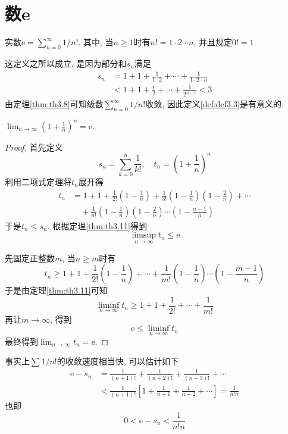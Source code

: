 \documentclass[cn,12pt,math=mtpro2,citestyle=gb7714-2015,bibstyle=gb7714-2015,twocol]{elegantbook}
\newcommand{\limn}{\lim_{n\to\infty}}
\begin{document}
\section{数e}
\begin{definition}\label{def:def3.3}
实数$ \text{e}=\sum_{n=0}^{\infty}1/{n!}$. 其中, 当$n\geq 1$时有$n!=1\cdot2\cdots n$, 并且规定$0!=1$.
\end{definition}
这定义之所以成立, 是因为部分和$s_n$满足
\begin{align*}
s_n&=1+1+\frac{1}{1\cdot2}+\cdots+\frac{1}{1\cdot2\cdots n} \\
&<1+1+\frac{1}{2}+\cdots+\frac{1}{2^{n-1}}<3
\end{align*}
由定理\ref{thm:th3.8}可知级数$\sum_{n=0}^{\infty}1/{n!}$收敛, 因此定义\ref{def:def3.3}是有意义的.
\begin{theorem}\label{thm:th3.18}
  $\displaystyle\limn \left(1+\frac{1}{n}\right)^n=\text{e}$.
\end{theorem}
\begin{proof}
  首先定义
  $$ s_n=\sum_{k=0}^{n}\frac{1}{k!},\quad t_n=\left(1+\frac{1}{n}\right)^n$$
  利用二项式定理将$t_n$展开得
  \begin{align*}
  t_n&=1+1+\frac{1}{2!}\left(1-\frac{1}{n}\right)+\frac{1}{3!}\left(1-\frac{1}{n}\right)\left(1-\frac{2}{n}\right)+\cdots \\
  &\quad +\frac{1}{n!}\left(1-\frac{1}{n}\right)\left(1-\frac{2}{n}\right)\cdots\left(1-\frac{n-1}{n}\right)
  \end{align*}
  于是$t_n\leq s_n$. 根据定理\ref{thm:th3.11}得到$$\displaystyle\limsup_{n\to\infty} t_n\leq \text{e}$$

  先固定正整数$m$, 当$n\geq m$时有
  $$t_n\geq1+1+\frac{1}{2!}\left(1-\frac{1}{n}\right)+\cdots+\frac{1}{m!}\left(1-\frac{1}{n}\right)\cdots\left(1-\frac{m-1}{n}\right)$$
  于是由定理\ref{thm:th3.11}可知
  $$\displaystyle\liminf_{n\to\infty} t_n\geq 1+1+\frac{1}{2!}+\cdots+\frac{1}{m!}$$
  再让$m\rightarrow\infty$, 得到
  $$\displaystyle\text{e}\leq \liminf_{n\to\infty} t_n$$
  最终得到$\limn t_n=\text{e}$.
\end{proof}
事实上$\sum1/n!$的收敛速度相当快, 可以估计如下
\begin{align*}
\text{e}-s_n&=\frac{1}{(n+1)!}+\frac{1}{(n+2)!}+\frac{1}{(n+3)!}+\cdots \\
&<\frac{1}{(n+1)!}\left[1+\frac{1}{n+1}+\frac{1}{n+2}+\cdots\right] =\frac{1}{n!n}
\end{align*}
也即
\begin{equation}\label{eq3.6}
0<\text{e}-s_n<\frac{1}{n!n}
\end{equation}
\end{document}
